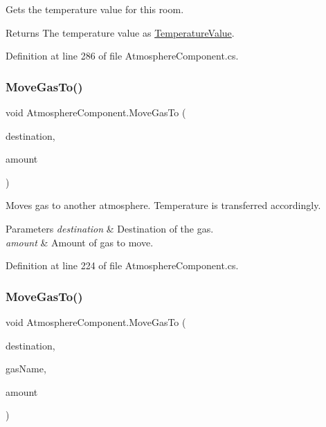 Gets the temperature value for this room. 

\begin{DoxyReturn}{Returns}
The temperature value as \hyperlink{struct_temperature_value}{Temperature\+Value}. 
\end{DoxyReturn}


Definition at line 286 of file Atmosphere\+Component.\+cs.

\mbox{\label{class_atmosphere_component_a8f0b2f406c993dff7c315e43624775b0}} 
\subsubsection{\texorpdfstring{Move\+Gas\+To()}{MoveGasTo()}\hspace{0.1cm}{\footnotesize\ttfamily [1/2]}}
{\footnotesize\ttfamily void Atmosphere\+Component.\+Move\+Gas\+To (\begin{DoxyParamCaption}\item[{\hyperlink{class_atmosphere_component}{Atmosphere\+Component}}]{destination,  }\item[{float}]{amount }\end{DoxyParamCaption})}



Moves gas to another atmosphere. Temperature is transferred accordingly. 


\begin{DoxyParams}{Parameters}
{\em destination} & Destination of the gas.\\
\hline
{\em amount} & Amount of gas to move.\\
\hline
\end{DoxyParams}


Definition at line 224 of file Atmosphere\+Component.\+cs.

\mbox{\label{class_atmosphere_component_a5344325e734a5b8c1064bf23efa15f03}} 
\subsubsection{\texorpdfstring{Move\+Gas\+To()}{MoveGasTo()}\hspace{0.1cm}{\footnotesize\ttfamily [2/2]}}
{\footnotesize\ttfamily void Atmosphere\+Component.\+Move\+Gas\+To (\begin{DoxyParamCaption}\item[{\hyperlink{class_atmosphere_component}{Atmosphere\+Component}}]{destination,  }\item[{string}]{gas\+Name,  }\item[{float}]{amount }\end{DoxyParamCaption})}




